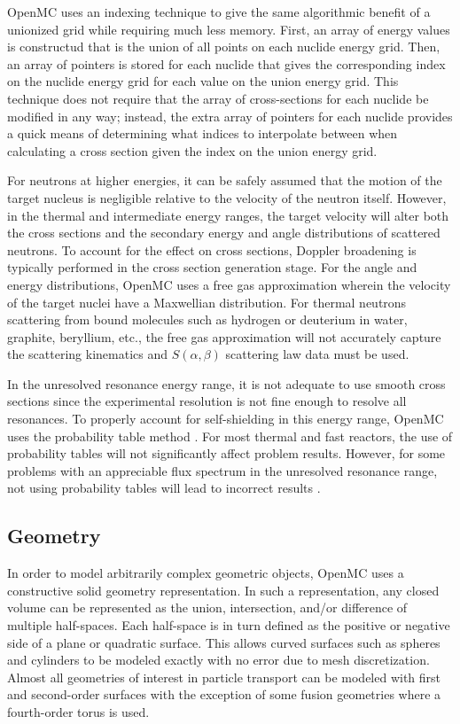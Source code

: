 \documentclass{elsarticle}
\begin{document}
OpenMC uses an indexing technique to give the same algorithmic benefit of a
unionized grid while requiring much less memory. First, an array of energy
values is constructud that is the union of all points on each nuclide energy
grid. Then, an array of pointers is stored for each nuclide that gives the
corresponding index on the nuclide energy grid for each value on the union
energy grid. This technique does not require that the array of cross-sections
for each nuclide be modified in any way; instead, the extra array of pointers
for each nuclide provides a quick means of determining what indices to
interpolate between when calculating a cross section given the index on the
union energy grid.

For neutrons at higher energies, it can be safely assumed that the motion of the
target nucleus is negligible relative to the velocity of the neutron
itself. However, in the thermal and intermediate energy ranges, the target
velocity will alter both the cross sections and the secondary energy and angle
distributions of scattered neutrons. To account for the effect on cross
sections, Doppler broadening is typically performed in the cross section
generation stage. For the angle and energy distributions, OpenMC uses a free gas
approximation \cite{freegas} wherein the velocity of the target nuclei have a
Maxwellian distribution. For thermal neutrons scattering from bound molecules
such as hydrogen or deuterium in water, graphite, beryllium, etc., the free gas
approximation will not accurately capture the scattering kinematics and
$S(\alpha,\beta)$ scattering law data must be used.

In the unresolved resonance energy range, it is not adequate to use smooth cross
sections since the experimental resolution is not fine enough to resolve all
resonances. To properly account for self-shielding in this energy range, OpenMC
uses the probability table method \cite{probtables}. For most thermal and fast
reactors, the use of probability tables will not significantly affect problem
results. However, for some problems with an appreciable flux spectrum in the
unresolved resonance range, not using probability tables will lead to incorrect
results \cite{probtables-testing}.

\subsection{Geometry}

In order to model arbitrarily complex geometric objects, OpenMC uses a
constructive solid geometry representation. In such a representation, any closed
volume can be represented as the union, intersection, and/or difference of
multiple half-spaces. Each half-space is in turn defined as the positive or
negative side of a plane or quadratic surface. This allows curved surfaces such
as spheres and cylinders to be modeled exactly with no error due to mesh
discretization. Almost all geometries of interest in particle transport can be
modeled with first and second-order surfaces with the exception of some fusion
geometries where a fourth-order torus is used.
\end{document}
